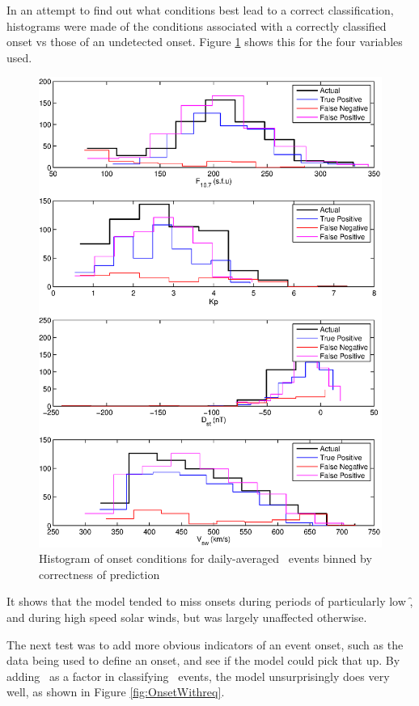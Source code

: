 In an attempt to find out what conditions best lead to a correct classification, histograms were made of the conditions associated with a correctly classified onset vs those of an undetected onset. Figure \ref{fig:OnsetEventsHist} shows this for the four variables used.

\begin{figure}[htp!]
	\centering
	\includegraphics[width=0.85\linewidth]{Figures/CH5/NNBinaryOnset-daily-hist.eps}
	\caption{Histogram of onset conditions for daily-averaged \req\ events binned by correctness of prediction}
	\label{fig:OnsetEventsHist}
\end{figure}

It shows that the model tended to miss onsets during periods of particularly low \f, and during high speed solar winds, but was largely unaffected otherwise.

The next test was to add more obvious indicators of an event onset, such as the data being used to define an onset, and see if the model could pick that up. By adding \req\ as a factor in classifying \req\ events, the model unsurprisingly does very well, as shown in Figure \ref{fig:OnsetWithreq}.

